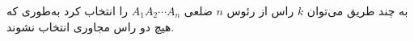 \EXERCISE
به چند طریق می‌توان
$k$
راس از رئوس
$n$
ضلعی
$A_1 A_2 \cdots A_n$
را انتخاب کرد به‌طوری که هیچ دو راس مجاوری انتخاب نشوند.